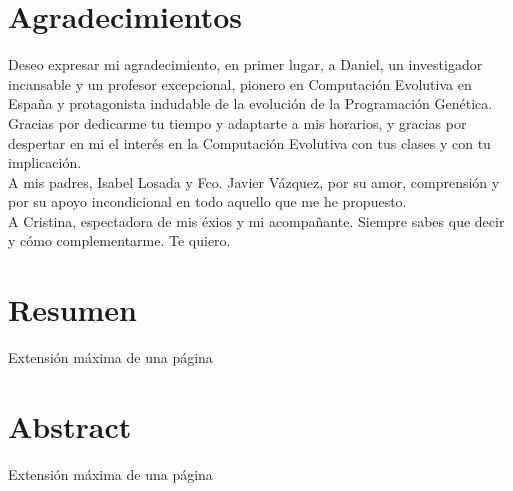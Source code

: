 \chapter{Agradecimientos}

Deseo expresar mi agradecimiento, en primer lugar, a Daniel, un investigador incansable y un profesor excepcional, pionero en Computación Evolutiva en España y protagonista indudable de la evolución de la Programación Genética. Gracias por dedicarme tu tiempo y adaptarte a mis horarios, y gracias por despertar en mi el interés en la Computación Evolutiva con tus clases y con tu implicación.\\

A mis padres, Isabel Losada y Fco. Javier Vázquez, por su amor, comprensión y por su apoyo incondicional en todo aquello que me he propuesto.\\

A Cristina, espectadora de mis éxios y mi acompañante. Siempre sabes que decir y cómo complementarme. Te quiero.

\chapter{Resumen}

Extensión máxima de una página

\chapter{Abstract}

Extensión máxima de una página
